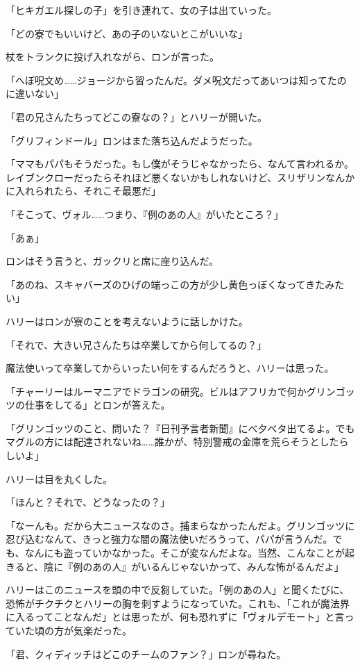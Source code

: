\documentclass[10pt,a4paper]{article}
\begin{document}
\begin{CJK}{UTF8}{min}
「ヒキガエル探しの子」を引き連れて、女の子は出ていった。

「どの寮でもいいけど、あの子のいないとこがいいな」

杖をトランクに投げ入れながら、ロンが言った。

「へぼ呪文め……ジョージから習ったんだ。ダメ呪文だってあいつは知ってたのに違いない」

「君の兄さんたちってどこの寮なの？」とハリーが開いた。

「グリフィンドール」ロンはまた落ち込んだようだった。

「ママもパパもそうだった。もし僕がそうじゃなかったら、なんて言われるか。レイブンクローだったらそれほど悪くないかもしれないけど、スリザリンなんかに入れられたら、それこそ最悪だ」

「そこって、ヴォル……つまり、『例のあの人』がいたところ？」

「あぁ」

ロンはそう言うと、ガックリと席に座り込んだ。

「あのね、スキャバーズのひげの端っこの方が少し黄色っぼくなってきたみたい」

ハリーはロンが寮のことを考えないように話しかけた。

「それで、大きい兄さんたちは卒業してから何してるの？」

魔法使いって卒業してからいったい何をするんだろうと、ハリーは思った。

「チャーリーはルーマニアでドラゴンの研究。ビルはアフリカで何かグリンゴッツの仕事をしてる」とロンが答えた。

「グリンゴッツのこと、問いた？『日刊予言者新聞』にべ夕べタ出てるよ。でもマグルの方には配達されないね……誰かが、特別警戒の金庫を荒らそうとしたらしいよ」

ハリーは目を丸くした。

「ほんと？それで、どうなったの？」

「なーんも。だから大ニュースなのさ。捕まらなかったんだよ。グリンゴッツに忍び込むなんて、きっと強力な闇の魔法使いだろうって、パパが言うんだ。でも、なんにも盗っていかなかった。そこが変なんだよな。当然、こんなことが起きると、陰に『例のあの人』がいるんじゃないかって、みんな怖がるんだよ」

ハリーはこのニュースを頭の中で反芻していた。「例のあの人」と聞くたびに、恐怖がチクチクとハリーの胸を刺すようになっていた。これも、「これが魔法界に入るってことなんだ」とは思ったが、何も恐れずに「ヴォルデモート」と言っていた頃の方が気楽だった。

「君、クィディッチはどこのチームのファン？」ロンが尋ねた。


\end{CJK}
\end{document}
